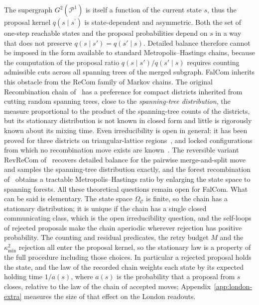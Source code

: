 \documentclass[11pt]{article}
\theoremstyle{definition}
\begin{document}
The supergraph $G^2(\mathcal{P}^1)$ is itself a function of the current state $s$, thus the proposal kernel $q(s \mid s^\prime)$ is state-dependent and asymmetric. Both the set of one-step reachable states and the proposal probabilities depend on $s$ in a way that does not preserve $q(s \mid s') = q(s' \mid s)$. Detailed balance therefore cannot be imposed in the form available to standard Metropolis--Hastings chains, because the computation of the proposal ratio $q(s \mid s') / q(s' \mid s)$ requires counting admissible cuts across all spanning trees of the merged subgraph. FalCom inherits this obstacle from the ReCom family of Markov chains. The original Recombination chain
of~\citet{deford2021recombination} has a preference for compact districts inherited from cutting random spanning trees, close to the \emph{spanning-tree distribution}, the measure proportional to the product of the spanning-tree counts of the districts, but its stationary distribution is not known in closed form and little is rigorously known about its mixing time. Even irreducibility is open in general: it has been proved for three districts on triangular-lattice regions~\citep{cannon2024irreducibility}, and locked configurations from which no recombination move exists are known~\citep{akitaya2026balanced}. The reversible variant RevReCom of~\citet{cannon2026spanning} recovers detailed balance for the pairwise merge-and-split move and samples the spanning-tree distribution exactly, and the forest recombination of~\citet{autry2023forest} obtains a tractable Metropolis--Hastings ratio by enlarging the state space to spanning forests. All these theoretical questions remain open for FalCom. What can be said is elementary. The state space $\Omega_\mathcal{C}$ is finite, so the chain has a stationary distribution; it is unique if the chain has a single closed communicating class, which is the open irreducibility question, and the self-loops of rejected proposals make the chain aperiodic wherever rejection has positive probability. The counting and residual predicates, the retry budget $M$ and the $\kappa^2_{\min}$ rejection all enter the proposal kernel, so the stationary law is a property of the full procedure including those choices. In particular a rejected proposal holds the state, and the law of the recorded chain weights each state by its expected holding time $1/a(s)$, where $a(s)$ is the probability that a proposal from $s$ closes, relative to the law of the chain of accepted moves; Appendix~\ref{app:london-extra} measures the size of that effect on the London readouts.
\end{document}
